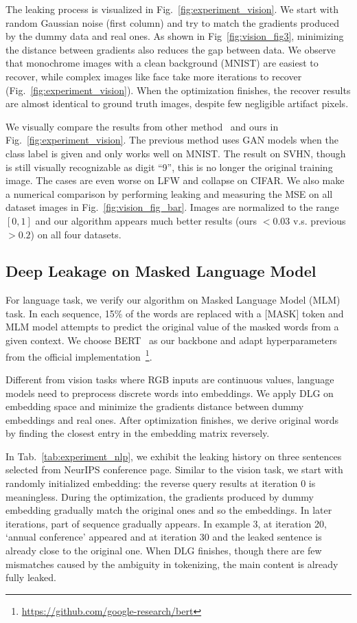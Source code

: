 The leaking process is visualized in Fig.~\ref{fig:experiment_vision}. We start with random Gaussian noise (first column) and try to match the gradients produced by the dummy data and real ones. As shown in Fig~\ref{fig:vision_fig3}, minimizing the distance between gradients also reduces the gap between data. We observe that monochrome images with a clean background (MNIST) are easiest to recover, while complex images like face take more iterations to recover (Fig.~\ref{fig:experiment_vision}). When the optimization finishes, the recover results are almost identical to ground truth images, despite few negligible artifact pixels.

We visually compare the results from other method~\cite{Melis2018unintended} and ours in Fig.~\ref{fig:experiment_vision}. 
The previous method uses GAN models when the class label is given and only works well on MNIST. The result on SVHN, though is still visually recognizable as digit ``9'', this is no longer the original training image. The cases are even worse on LFW and collapse on CIFAR. We also make a numerical comparison by performing leaking and measuring the MSE on all dataset images in Fig.~\ref{fig:vision_fig_bar}. Images are normalized to the range $[0, 1]$ and our algorithm appears much better results (ours $< 0.03$ v.s. previous $> 0.2$) on all four datasets.


\subsection{Deep Leakage on Masked Language Model} \label{sec:experiments_nlp}



For language task, we verify our algorithm on Masked Language Model (MLM) task. In each sequence, 15\% of the words are replaced with a [MASK] token and MLM model attempts to predict the original value of the masked words from a given context. We choose BERT~\cite{devlin2018bert} as our backbone and adapt hyperparameters from the official implementation~\footnote{\url{https://github.com/google-research/bert}}.

Different from vision tasks where RGB inputs are continuous values, language models need to preprocess discrete words into embeddings. We apply DLG on embedding space and minimize the gradients distance between dummy embeddings and real ones. After optimization finishes, we derive original words by finding the closest entry in the embedding matrix reversely. 

In Tab.~\ref{tab:experiment_nlp}, we exhibit the leaking history on three sentences selected from NeurIPS conference page. Similar to the vision task, we start with randomly initialized embedding: the reverse query results at iteration 0 is meaningless. During the optimization, the gradients produced by dummy embedding gradually match the original ones and so the embeddings. In later iterations, part of sequence gradually appears. In example 3, at iteration 20, `annual conference' appeared and at iteration 30 and the leaked sentence is already close to the original one. When DLG finishes, though there are few mismatches caused by the ambiguity in tokenizing, the main content is already fully leaked.
